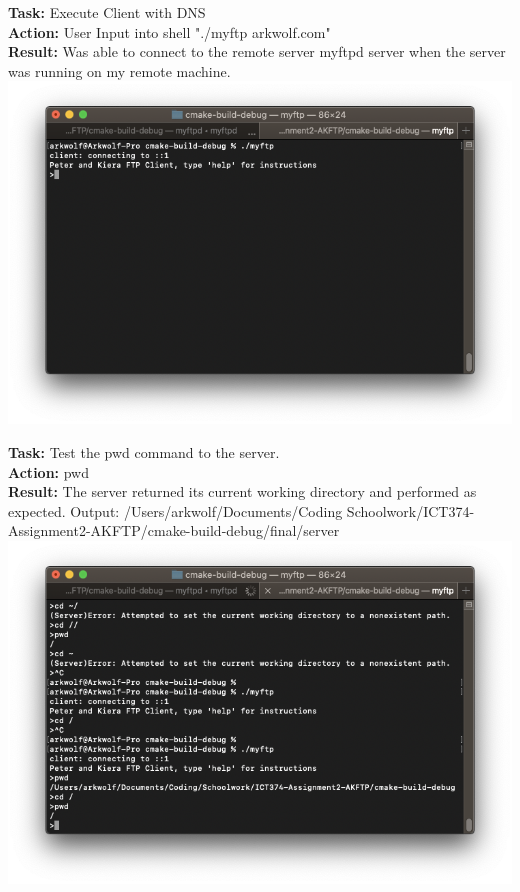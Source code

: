 \documentclass{article}
\begin{document}
\textbf{Task:} Execute Client with DNS\\
\textbf{Action:} User Input into shell "./myftp arkwolf.com"\\
\textbf{Result:} Was able to connect to the remote server myftpd server when the server was running on my remote machine.\\
\includegraphics[width=\textwidth]{testpictures/connect}

\textbf{Task:} Test the pwd command to the server.\\
\textbf{Action:} pwd\\
\textbf{Result:} The server returned its current working directory and performed as expected. Output: /Users/arkwolf/Documents/Coding Schoolwork/ICT374-Assignment2-AKFTP/cmake-build-debug/final/server\\
\includegraphics[width=\textwidth]{testpictures/pwd}
\end{document}
